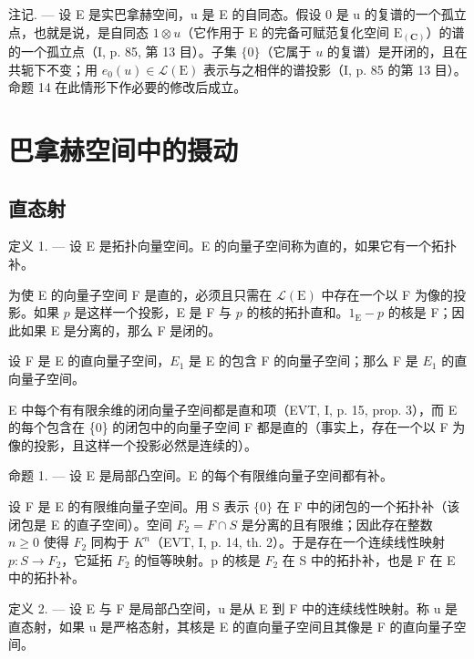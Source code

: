 注记. --- 设 E 是实巴拿赫空间，u 是 E 的自同态。假设 0 是 u 的复谱的一个孤立点，也就是说，是自同态 \(1 \otimes u\)（它作用于 E 的完备可赋范复化空间 \(\mathrm{E}_{(\mathbf{C})}\)）的谱的一个孤立点（I, p. 85, 第 13 目）。子集 \(\{0\}\)（它属于 \(u\) 的复谱）是开闭的，且在共轭下不变；用 \(e_0(u) \in \mathcal{L}(\mathrm{E})\) 表示与之相伴的谱投影（I, p. 85 的第 13 目）。命题 14 在此情形下作必要的修改后成立。

\section{巴拿赫空间中的摄动}

\subsection{直态射}

定义 1. --- 设 E 是拓扑向量空间。E 的向量子空间称为直的，如果它有一个拓扑补。

为使 E 的向量子空间 F 是直的，必须且只需在 \(\mathcal{L}(\mathrm{E})\) 中存在一个以 F 为像的投影。如果 \(p\) 是这样一个投影，E 是 F 与 \(p\) 的核的拓扑直和。\(1_{\mathrm{E}} - p\) 的核是 F；因此如果 E 是分离的，那么 F 是闭的。

设 F 是 E 的直向量子空间，\(E_{1}\) 是 E 的包含 F 的向量子空间；那么 F 是 \(E_{1}\) 的直向量子空间。

E 中每个有有限余维的闭向量子空间都是直和项（EVT, I, p. 15, prop. 3），而 E 的每个包含在 \{0\} 的闭包中的向量子空间 F 都是直的（事实上，存在一个以 F 为像的投影，且这样一个投影必然是连续的）。

命题 1. --- 设 E 是局部凸空间。E 的每个有限维向量子空间都有补。

设 F 是 E 的有限维向量子空间。用 S 表示 \(\{0\}\) 在 F 中的闭包的一个拓扑补（该闭包是 E 的直子空间）。空间 \(F_{2} = F \cap S\) 是分离的且有限维；因此存在整数 \(n \geqslant 0\) 使得 \(F_{2}\) 同构于 \(K^{n}\)（EVT, I, p. 14, th. 2）。于是存在一个连续线性映射 \(p: S \to F_{2}\)，它延拓 \(F_{2}\) 的恒等映射。p 的核是 \(F_{2}\) 在 S 中的拓扑补，也是 F 在 E 中的拓扑补。

定义 2. --- 设 E 与 F 是局部凸空间，u 是从 E 到 F 中的连续线性映射。称 u 是直态射，如果 u 是严格态射，其核是 E 的直向量子空间且其像是 F 的直向量子空间。

